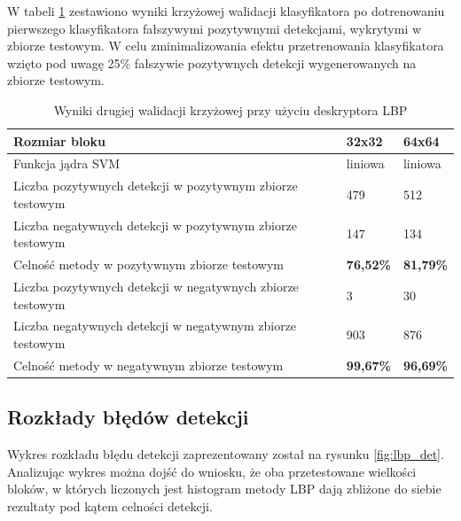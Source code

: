 W tabeli \ref{tab:lbp_second} zestawiono wyniki krzyżowej walidacji klasyfikatora po dotrenowaniu pierwszego klasyfikatora fałszywymi pozytywnymi detekcjami, wykrytymi w zbiorze testowym. W celu zminimalizowania efektu przetrenowania klasyfikatora wzięto pod uwagę 25\% fałszywie pozytywnych detekcji wygenerowanych na zbiorze testowym.

\begin{center}
    \begin{longtable}{ | p{5cm} | p{3cm} | p{3cm} |}
    \caption{Wyniki drugiej walidacji krzyżowej przy użyciu deskryptora LBP}
    \label{tab:lbp_second}\\
    \hline
	Rozmiar bloku & 32x32 & 64x64 \\ \hline
	Funkcja jądra SVM & liniowa & liniowa  \\ \hline
    Liczba pozytywnych detekcji w pozytywnym zbiorze testowym & 479 & 512 \\ \hline
    Liczba negatywnych detekcji w pozytywnym zbiorze testowym & 147 & 134 \\ \hline
    Celność metody w pozytywnym zbiorze testowym & \textbf{76,52\%} & \textbf{81,79\%} \\ \hline
    Liczba pozytywnych detekcji w negatywnych zbiorze testowym & 3 & 30 \\ \hline
    Liczba negatywnych detekcji w negatywnym zbiorze testowym & 903 & 876 \\ \hline
    Celność metody w negatywnym zbiorze testowym & \textbf{99,67\%} & \textbf{96,69\%} \\ \hline
    \end{longtable}
\end{center}


\subsection{Rozkłady błędów detekcji}

Wykres rozkładu błędu detekcji zaprezentowany został na rysunku \ref{fig:lbp_det}. Analizując wykres można dojść do wniosku, że oba przetestowane wielkości bloków, w których liczonych jest histogram metody LBP dają zbliżone do siebie rezultaty pod kątem celności detekcji.


